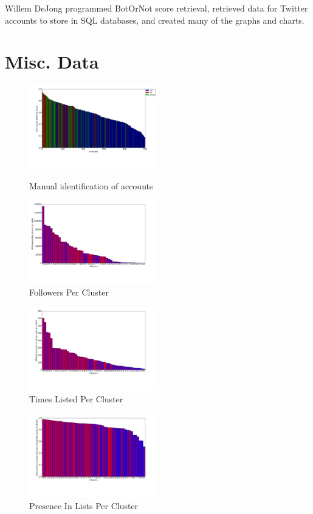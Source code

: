 \documentclass{sig-alternate-05-2015}
\begin{document}
Willem DeJong programmed BotOrNot score retrieval, retrieved data for Twitter accounts to store in SQL databases, and created many of the graphs and charts.

\section{Misc. Data}

\begin{figure}[h!]
	\caption{Manual identification of accounts}
	\centering
		\includegraphics[width=0.5\textwidth]{imgs/barvsaccnt}
	\label{fig:barvsaccnt}
\end{figure}

\begin{figure}[h!]
	\caption{Followers Per Cluster}
	\centering
		\includegraphics[width=0.5\textwidth]{imgs/followers}
\end{figure}

\begin{figure}[h!]
	\caption{Times Listed Per Cluster}
	\centering
		\includegraphics[width=0.5\textwidth]{imgs/listed2}
\end{figure}

\begin{figure}[h!]
	\caption{Presence In Lists Per Cluster}
	\centering
		\includegraphics[width=0.5\textwidth]{imgs/listed3}
\end{figure}

\end{document}
